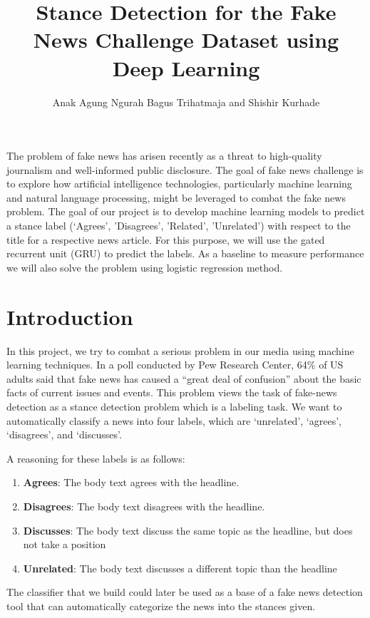 \documentclass[11.5pt]{article}
\title{Stance Detection for the Fake News Challenge Dataset using Deep Learning}
\author{Anak Agung Ngurah Bagus Trihatmaja and Shishir Kurhade}
\date{}
\begin{document}
\maketitle

\abstract
The problem of fake news has arisen recently as a threat to high-quality 
journalism and well-informed public disclosure. The goal of fake news 
challenge is to explore how artificial intelligence technologies, particularly
machine learning and natural language processing, might be leveraged to combat 
the fake news problem\cite{fake_news_challenge}. The goal of our project is to develop machine learning 
models to predict a stance label (‘Agrees’, ’Disagrees’, ’Related’, ’Unrelated’) 
with respect to the title for a respective news article. For this purpose, we 
will use the gated recurrent unit (GRU) to predict the labels. As a baseline to 
measure performance we will also solve the problem using logistic regression method.

\vspace{2mm}
\section{Introduction}
In this project, we try to combat a serious problem in our media using machine 
learning techniques. In a poll conducted by Pew Research Center, 64\% of US 
adults said that fake news has caused a “great deal of confusion” about the 
basic facts of current issues and events\cite{barthel_mitchell_holcomb_2016}. 
This problem views the task of fake-news detection as a stance detection problem 
which is a labeling task. We want to automatically classify a news into four labels, 
which are ‘unrelated’, ‘agrees’, ‘disagrees’, and ‘discusses’.  

A reasoning for these labels is as follows:
\begin{enumerate}
  \item \textbf{Agrees}: The body text agrees with the headline.
  \item \textbf{Disagrees}: The body text disagrees with the headline.
  \item \textbf{Discusses}: The body text discuss the same topic as the headline, 
    but does not take a position
  \item \textbf{Unrelated}: The body text discusses a different topic than the headline
\end{enumerate}

The classifier that we build could later be used as a base of a 
fake news detection tool that can automatically categorize the news into the 
stances given.
\end{document}
